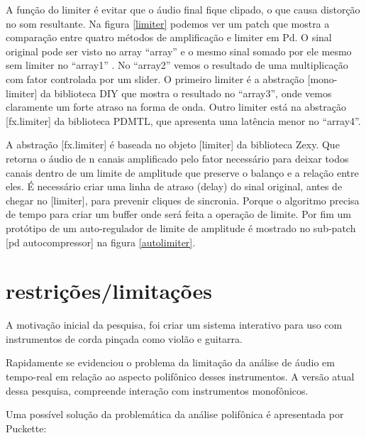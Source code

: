 \documentclass{ppgmus}
\begin{document}
A função do limiter é evitar que o áudio final fique clipado, o que causa distorção no som resultante.
Na figura \ref{limiter} podemos ver um patch que mostra a comparação entre quatro
métodos de amplificação e limiter em Pd. O sinal original pode ser
visto no array ``array'' e o mesmo sinal somado por ele mesmo sem limiter no ``array1'' .
No ``array2'' vemos o resultado de uma multiplicação com fator controlada por
um slider. O primeiro limiter é a abstração [mono-limiter] da biblioteca DIY que mostra
o resultado no ``array3'', onde vemos claramente um forte atraso na 
forma de onda. Outro limiter está na  abstração [fx.limiter\texttildelow] da 
biblioteca PDMTL, que apresenta uma latência menor no ``array4''.

A abstração [fx.limiter\texttildelow] é baseada no objeto [limiter\texttildelow] da biblioteca Zexy.
Que retorna o áudio de n canais amplificado pelo fator necessário para
deixar todos canais dentro de um limite de amplitude que preserve 
o balanço e a relação entre eles. É necessário criar uma linha de atraso
(delay) do sinal original, antes de chegar no [limiter\texttildelow],
para prevenir cliques de sincronia. Porque o algoritmo precisa de
tempo para criar um buffer onde será feita a operação de limite.
Por fim um protótipo de um auto-regulador de limite de amplitude é mostrado
no sub-patch [pd autocompressor] na figura \ref{autolimiter}.




\newpage


\section{restrições/limitações}


A motivação inicial da pesquisa, foi criar um sistema interativo
para uso com instrumentos de corda pinçada como violão e guitarra.

Rapidamente se evidenciou o problema da limitação da análise de áudio
em tempo-real em relação ao aspecto polifônico desses instrumentos.
A versão atual dessa pesquisa, compreende interação com instrumentos
monofônicos.

Uma possível solução da problemática da análise polifônica é apresentada
por Puckette:
\end{document}
